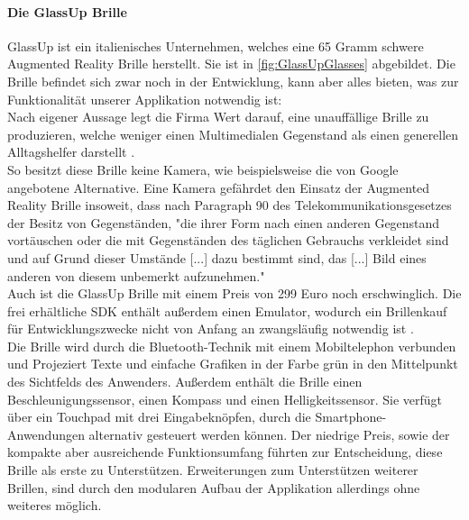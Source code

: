 \paragraph{Die GlassUp Brille}
GlassUp ist ein italienisches Unternehmen, welches eine 65 Gramm \cite{faq} schwere Augmented Reality Brille herstellt. Sie ist in \ref{fig:GlassUpGlasses} abgebildet. Die Brille befindet sich zwar noch in der Entwicklung, kann aber alles bieten, was zur Funktionalität unserer Applikation notwendig ist:\\
Nach eigener Aussage legt die Firma Wert darauf, eine unauffällige Brille zu produzieren, welche weniger einen Multimedialen Gegenstand als einen generellen Alltagshelfer darstellt \cite{glassup_home_2017}.\\
So besitzt diese Brille keine Kamera, wie beispielsweise die von Google angebotene Alternative\cite{google_glassescamera_2017}. Eine Kamera gefährdet den Einsatz der Augmented Reality Brille insoweit, dass nach Paragraph 90 des Telekommunikationsgesetzes der Besitz von Gegenständen, "die ihrer Form nach einen anderen Gegenstand vortäuschen oder die mit Gegenständen des täglichen Gebrauchs verkleidet sind und auf Grund dieser Umstände [...] dazu bestimmt sind, das [...] Bild eines anderen von diesem unbemerkt aufzunehmen."\\
Auch ist die GlassUp Brille mit einem Preis von 299 Euro \cite{glassup_faq_2017} noch erschwinglich. Die frei erhältliche SDK enthält außerdem einen Emulator, wodurch ein Brillenkauf für Entwicklungszwecke nicht von Anfang an zwangsläufig notwendig ist \cite{glassup_sdk_2017}.\\
Die Brille wird durch die Bluetooth-Technik mit einem Mobiltelephon verbunden und Projeziert Texte und einfache Grafiken in der Farbe grün in den Mittelpunkt des Sichtfelds des Anwenders. Außerdem enthält die Brille einen Beschleunigungssensor, einen Kompass und einen Helligkeitssensor\cite{glassup_devguide_2015}.
Sie verfügt über ein Touchpad mit drei Eingabeknöpfen, durch die Smartphone-Anwendungen alternativ gesteuert werden können\cite{glassup_devguide_2015}.
Der niedrige Preis, sowie der kompakte aber ausreichende Funktionsumfang führten zur Entscheidung, diese Brille als erste zu Unterstützen. Erweiterungen zum Unterstützen weiterer Brillen, sind durch den modularen Aufbau der Applikation allerdings ohne weiteres möglich.

